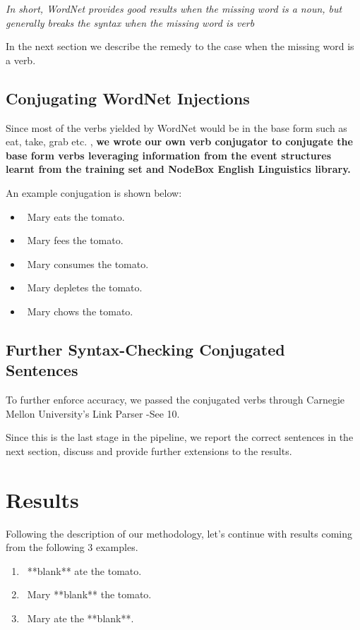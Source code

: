 \documentclass{article}[12pt]
\theoremstyle{definition}
\begin{document}
\emph{In short, WordNet provides good results when the missing word is a noun, but generally breaks the syntax when the missing word is verb}

In the next section we describe the remedy to the case when the missing word is a verb.  

\subsection{Conjugating WordNet Injections}

Since most of the verbs yielded by WordNet would be in the base form such as eat, take, grab etc. , \textbf{we wrote our own verb conjugator to conjugate the base form verbs leveraging information from the event structures learnt from the training set and NodeBox English Linguistics library. }

An example conjugation is shown below: 

\begin{itemize}
\item\ Mary eats the tomato.
\item\ Mary fees the tomato.
\item\ Mary consumes the tomato.
\item\ Mary depletes the tomato.
\item\ Mary chows the tomato.
\end{itemize}

\subsection{Further Syntax-Checking Conjugated Sentences}

To further enforce accuracy, we passed the conjugated verbs through Carnegie Mellon University's Link Parser -See 10. 

Since this is the last stage in the pipeline, we report the correct sentences in the next section, discuss and provide further extensions to the results. 

\section{Results}

Following the description of our methodology, let's continue with results coming from the following 3 examples. 
\begin{enumerate}
\item\ **blank** ate the tomato.
\item\ Mary **blank** the tomato.
\item\ Mary ate the **blank**. 
\end{enumerate}
\end{document}
